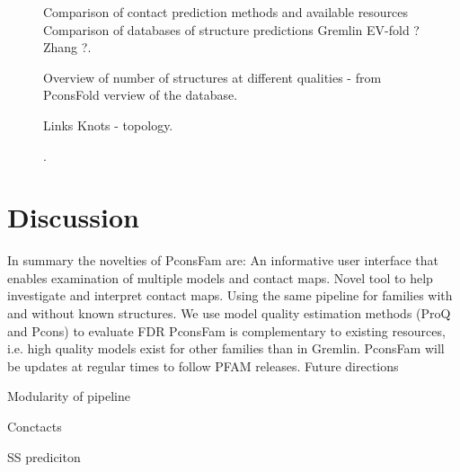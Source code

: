 \documentclass[a4,center,fleqn]{NAR}
\begin{document}
\begin{figure}[t]
\begin{center}
\end{center}
\caption{Comparison of contact prediction methods and available resources
Comparison of databases of structure predictions
Gremlin
EV-fold ?
Zhang ?.}
\label{fig:comparison}
\end{figure}


\begin{figure}[t]
\begin{center}
\end{center}
\caption{Overview of number of structures at different qualities - from PconsFold
verview of the database.}
\label{fig:overview}
\end{figure}


\begin{figure}[t]
\begin{center}
\end{center}
\caption{Links Knots - topology.}
\label{fig:Interface}
\end{figure}


\begin{figure}[t]
\begin{center}
\end{center}
\caption{.}
\label{fig:exampel PF0009.24}
\end{figure}








\section{Discussion}



                
In summary the novelties of PconsFam are:
An informative user interface that enables examination of multiple models and contact maps.
Novel tool to help investigate and interpret contact maps.
Using the same pipeline for families with and without known structures.
We use model quality estimation methods (ProQ and Pcons) to evaluate FDR 
PconsFam is complementary to existing resources, i.e. high quality models exist for other families than in Gremlin.
PconsFam will be updates at regular times to follow PFAM releases.
Future directions

Modularity of pipeline


Conctacts

SS prediciton
\end{document}
